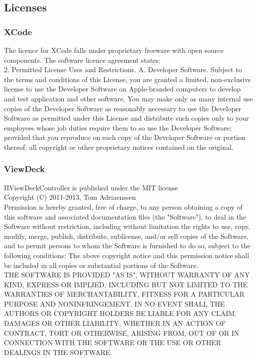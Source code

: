 \documentclass[a4wide, 10pt]{article}
\begin{document}
\subsection{Licenses}

\subsubsection{XCode}

The licence for XCode falls under proprietary freeware with open source components. The software licence agreement states:\\
2. Permitted License Uses and Restrictions.
A. Developer Software. Subject to the terms and conditions of this License, you are granted a limited, non-exclusive
license to use the Developer Software on Apple-branded computers to develop and test application
and other software. You may make only as many internal use copies of the Developer Software as
reasonably necessary to use the Developer Software as permitted under this License and distribute such
copies only to your employees whose job duties require them to so use the Developer Software; provided
that you reproduce on each copy of the Developer Software or portion thereof, all copyright or other
proprietary notices contained on the original.

\subsubsection{ViewDeck}
IIViewDeckController is published under the MIT license\\

Copyright (C) 2011-2013, Tom Adriaenssen\\
Permission is hereby granted, free of charge, to any person obtaining a copy of this software and associated documentation files (the "Software"), to deal in the Software without restriction, including without limitation the rights to use, copy, modify, merge, publish, distribute, sublicense, and/or sell copies of the Software, and to permit persons to whom the Software is furnished to do so, subject to the following conditions:
The above copyright notice and this permission notice shall be included in all copies or substantial portions of the Software.\\
THE SOFTWARE IS PROVIDED "AS IS", WITHOUT WARRANTY OF ANY KIND, EXPRESS OR IMPLIED, INCLUDING BUT NOT LIMITED TO THE WARRANTIES OF MERCHANTABILITY, FITNESS FOR A PARTICULAR PURPOSE AND NONINFRINGEMENT. IN NO EVENT SHALL THE AUTHORS OR COPYRIGHT HOLDERS BE LIABLE FOR ANY CLAIM, DAMAGES OR OTHER LIABILITY, WHETHER IN AN ACTION OF CONTRACT, TORT OR OTHERWISE, ARISING FROM, OUT OF OR IN CONNECTION WITH THE SOFTWARE OR THE USE OR OTHER DEALINGS IN THE SOFTWARE.
\end{document}
